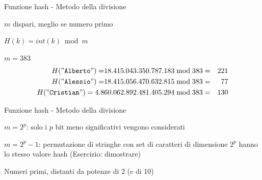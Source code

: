 \begin{frame}{Funzione hash - Metodo della divisione}

\vspace{-6pt}
\begin{myboxtitle}
\BIL
\item $m$ dispari, meglio se numero primo
\item $H(k) = \mathit{int}(k) \bmod m$
\EIL
\end{myboxtitle}

\begin{myboxtitle}[Esempio]
$m = 383$
\begin{align*}
H("\texttt{Alberto}") =  &18.415.043.350.787.183 \bmod 383 =&  221 \\
H("\texttt{Alessio}") =  &18.415.056.470.632.815  \bmod 383 =& 77 \\
H("\texttt{Cristian}") = 4.8&60.062.892.481.405.294   \bmod 383 =& 130
\end{align*}

\end{myboxtitle}
   
\end{frame}


\begin{frame}{Funzione hash - Metodo della divisione}         

\vspace{-6pt}
\BIL
\item $m=2^p$: solo i $p$ bit meno significativi vengono considerati
\item $m=2^p-1$: permutazione di stringhe con set di caratteri di dimensione 
$2^p$ hanno lo stesso valore hash (Esercizio: dimostrare)
\EIL

\BIL
\item Numeri primi, distanti da potenze di 2 (e di 10)
\EIL

\end{frame}

